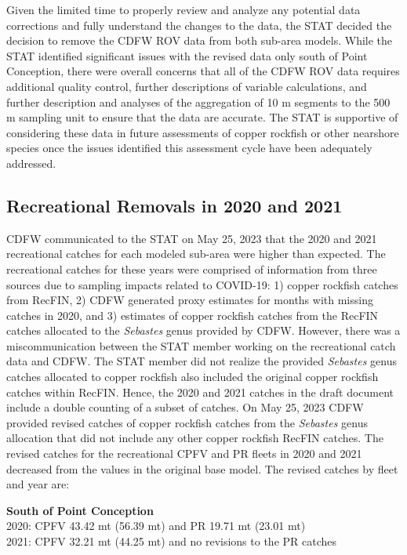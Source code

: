 \documentclass[
  letterpaper,
]{article}
\begin{document}
Given the limited time to properly review and analyze any potential data corrections and fully understand the changes to the data, the STAT decided the decision to remove the CDFW ROV data from both sub-area models. While the STAT identified significant issues with the revised data only south of Point Conception, there were overall concerns that all of the CDFW ROV data requires additional quality control, further descriptions of variable calculations, and further description and analyses of the aggregation of 10 m segments to the 500 m sampling unit to ensure that the data are accurate. The STAT is supportive of considering these data in future assessments of copper rockfish or other nearshore species once the issues identified this assessment cycle have been adequately addressed.

\hypertarget{recreational-removals-in-2020-and-2021}{%
\subsection{Recreational Removals in 2020 and 2021}\label{recreational-removals-in-2020-and-2021}}

CDFW communicated to the STAT on May 25, 2023 that the 2020 and 2021 recreational catches for each modeled sub-area were higher than expected. The recreational catches for these years were comprised of information from three sources due to sampling impacts related to COVID-19: 1) copper rockfish catches from RecFIN, 2) CDFW generated proxy estimates for months with missing catches in 2020, and 3) estimates of copper rockfish catches from the RecFIN catches allocated to the \emph{Sebastes} genus provided by CDFW. However, there was a miscommunication between the STAT member working on the recreational catch data and CDFW. The STAT member did not realize the provided \emph{Sebastes} genus catches allocated to copper rockfish also included the original copper rockfish catches within RecFIN. Hence, the 2020 and 2021 catches in the draft document include a double counting of a subset of catches. On May 25, 2023 CDFW provided revised catches of copper rockfish catches from the \emph{Sebastes} genus allocation that did not include any other copper rockfish RecFIN catches. The revised catches for the recreational CPFV and PR fleets in 2020 and 2021 decreased from the values in the original base model. The revised catches by fleet and year are:

\textbf{South of Point Conception}\\
2020: CPFV 43.42 mt (56.39 mt) and PR 19.71 mt (23.01 mt)\\
2021: CPFV 32.21 mt (44.25 mt) and no revisions to the PR catches
\end{document}
